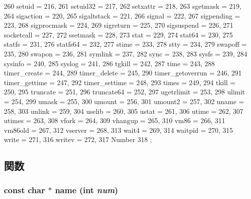 \begin{DoxyCode}
{260     setuid = 216,
261     setuid32 = 217,
262     setxattr = 218,
263     sgetmask = 219,
264     sigaction = 220,
265     sigaltstack = 221,
266     signal = 222,
267     sigpending = 223,
268     sigprocmask = 224,
269     sigreturn = 225,
270     sigsuspend = 226,
271     socketcall = 227,
272     ssetmask = 228,
273     stat = 229,
274     stat64 = 230,
275     statfs = 231,
276     statfs64 = 232,
277     stime = 233,
278     stty = 234,
279     swapoff = 235,
280     swapon = 236,
281     symlink = 237,
282     sync = 238,
283     sysfs = 239,
284     sysinfo = 240,
285     syslog = 241,
286     tgkill = 242,
287     time = 243,
288     timer_create = 244,
289     timer_delete = 245,
290     timer_getoverrun = 246,
291     timer_gettime = 247,
292     timer_settime = 248,
293     times = 249,
294     tkill = 250,
295     truncate = 251,
296     truncate64 = 252,
297     ugetrlimit = 253,
298     ulimit = 254,
299     umask = 255,
300     umount = 256,
301     umount2 = 257,
302     uname = 258,
303     unlink = 259,
304     uselib = 260,
305     ustat = 261,
306     utime = 262,
307     utimes = 263,
308     vfork = 264,
309     vhangup = 265,
310     vm86 = 266,
311     vm86old = 267,
312     vserver = 268,
313     wait4 = 269,
314     waitpid = 270,
315     write = 271,
316     writev = 272,
317         Number
318     };
\end{DoxyCode}


\subsection{関数}
\hypertarget{classSystemCalls_3_01Linux_01_4_a37ba7db7a75b51cfe17dcc3d2e3bd315}{
\subsubsection[{name}]{\setlength{\rightskip}{0pt plus 5cm}const char $\ast$ name (int {\em num})}}
\label{classSystemCalls_3_01Linux_01_4_a37ba7db7a75b51cfe17dcc3d2e3bd315}



